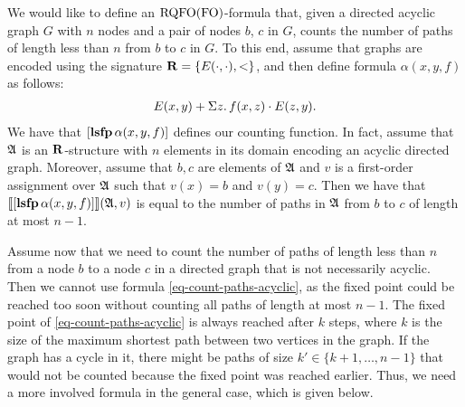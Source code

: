 \begin{exa} \label{ex:count-path}
We would like to define an ${\rm RQFO}({\rm FO})$-formula that, given a directed acyclic graph $G$ with $n$ nodes and a pair of nodes $b$, $c$ in $G$, counts the number of paths of length less than $n$ from $b$ to $c$ in $G$. To this end, assume that graphs are encoded using the signature $\mathbf{R} = \{ E(\cdot,\cdot),<\}$, and then define formula $\alpha(x, y, f)$ as follows:
\begin{eqnarray}\label{eq-count-paths-acyclic}
E(x,y) + \Sigma{z}.\, f(x,z)\cdot E(z,y).
\end{eqnarray}
We have that $[{\bf lsfp} \, \alpha(x,y,f)]$ defines our counting function. In fact, assume that $\mathfrak{A}$ is an $\mathbf{R}$-structure with $n$ elements in its domain encoding an acyclic directed graph. Moreover, assume that $b,c$ are elements of $\mathfrak{A}$ and $v$ is a first-order assignment over $\mathfrak{A}$ such that $v(x) = b$ and $v(y) = c$. Then we have that ${\llbracket{}{[{\bf lsfp} \, \alpha(x,y,f)]}\rrbracket}(\mathfrak{A},v)$ is equal to the number of paths in $\mathfrak{A}$ from $b$ to $c$ of length at most $n-1$.

Assume now that we need to count the number of paths of length less than $n$ from a node $b$ to a node $c$ in a directed graph that is not necessarily acyclic. 
Then we cannot use formula \eqref{eq-count-paths-acyclic}, as the fixed point could be reached too soon without counting all paths of length at most $n-1$. The fixed point of \eqref{eq-count-paths-acyclic} is always reached after $k$ steps, where $k$ is the size of the maximum shortest path between two vertices in the graph. If the graph has a cycle in it, there might be paths of size $k' \in \{k+1,\ldots,n-1\}$ that would not be counted because the fixed point was reached earlier. Thus, we need a more involved formula in the general case, which is given below. 


\end{exa}
